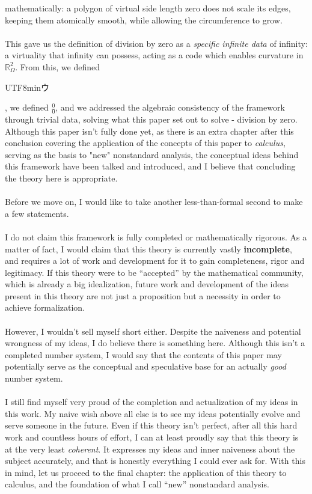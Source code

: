\documentclass{article}
\newcommand{\U}{\begin{CJK}{UTF8}{min}ウ\end{CJK}}
\begin{document}
mathematically: a polygon of virtual side length zero does not scale its edges, 
keeping them atomically smooth, while allowing the circumference to grow.
\\\\This gave us the definition of division by zero as a \textit{specific infinite 
data} of infinity: a virtuality that infinity can possess, acting as a code 
which enables curvature in $\mathbb{R}_\Omega^2$. From this, we defined \U{}, 
we defined $\frac{0}{0}$, and we addressed the algebraic consistency of the 
framework through trivial data, solving what this paper set out to solve - division by zero. Although this paper isn't fully done yet, as there is an extra chapter after this conclusion covering the application of the concepts of this paper to \textit{calculus}, serving as the basis to "new" nonstandard analysis, the conceptual ideas behind this framework have been talked and introduced, and I believe that concluding the theory here is appropriate.
\\\\Before we move on, I would like to take another less-than-formal second to make a few statements.
\\\\I do not claim this framework is fully completed or mathematically rigorous. As a matter of fact, I would claim that this theory is currently vastly \textbf{incomplete}, and requires a lot of work and development for it to gain completeness, rigor and legitimacy. If this theory were to be ``accepted'' by the mathematical community, which is already a big idealization, future work and development of the ideas present in this theory are not just a proposition but a necessity in order to achieve formalization.
\\\\However, I wouldn't sell myself short either. Despite the naiveness and potential wrongness of my ideas, I do believe there is something here. Although this isn't a completed number system, I would say that the contents of this paper may potentially serve as the conceptual and speculative base for an actually \textit{good} number system.
\\\\I still find myself very proud of the completion and actualization of my ideas in this work. My naive wish above all else is to see my ideas potentially evolve and serve someone in the future. Even if this theory isn't perfect, after all this hard work and countless hours of effort, I can at least proudly say that this theory is at the very least \textit{coherent}. It expresses my ideas and inner naiveness about the subject accurately, and that is honestly everything I could ever ask for. With this in mind, let us proceed to the final chapter: the application of this theory to calculus, and the foundation of what I call ``new'' nonstandard analysis.
\end{document}
